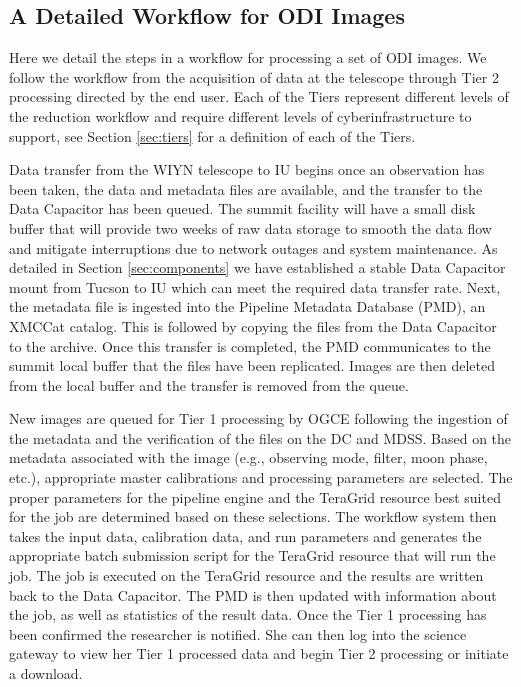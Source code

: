 \documentclass[10pt,conference]{IEEEtran}
\begin{document}
\subsection{A Detailed Workflow for ODI Images}\label{sec:workflow}

Here we detail the steps in a workflow for processing a set of ODI images. We follow the workflow from the acquisition of data at the telescope through Tier 2 processing directed by the end user. Each of the Tiers represent different levels of the reduction workflow and require different levels of cyberinfrastructure to support, see Section \ref{sec:tiers} for a definition of each of the Tiers.

Data transfer from the WIYN telescope to IU begins once an observation has been taken, the data and metadata files are available, and the transfer to the Data Capacitor has been queued. 
The summit facility will have a small disk buffer that will provide two weeks of raw data storage to smooth the data flow and mitigate interruptions due to network outages and system maintenance. As detailed in Section \ref{sec:components} we have established a stable Data Capacitor mount from Tucson to IU which can meet the required data transfer rate. Next, the metadata file is ingested into the Pipeline Metadata Database (PMD), an XMCCat catalog. This is followed by copying the files from the Data Capacitor to the archive. Once this transfer is completed, the PMD communicates to the summit local buffer that the files have been replicated. Images are then deleted from the local buffer and the transfer is removed from the queue.

New images are queued for Tier 1 processing by OGCE following the ingestion of the metadata and the verification of the files on the DC and MDSS. Based on the metadata associated with the image (e.g., observing mode, filter, moon phase, etc.), appropriate master calibrations and processing parameters are selected. The proper parameters for the pipeline engine and the TeraGrid resource best suited for the job are determined based on these selections. The workflow system then takes the input data, calibration data, and run parameters and generates the appropriate batch submission script for the TeraGrid resource that will run the job. The job is executed on the TeraGrid resource and the results are written back to the Data Capacitor. The PMD is then updated with information about the job, as well as statistics of the result data. Once the Tier 1 processing has been confirmed the researcher is notified. She can then log into the science gateway to view her Tier 1 processed data and begin Tier 2 processing or initiate a download.
\end{document}
